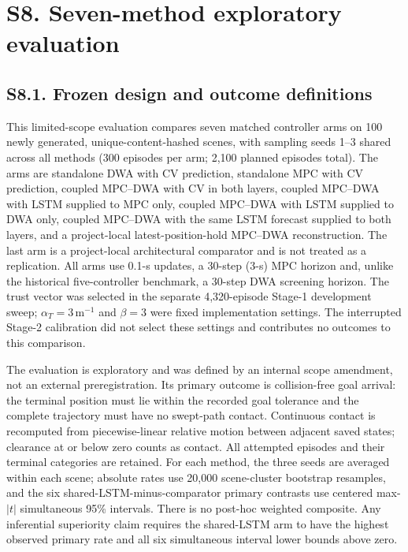 \documentclass[10pt]{article}
\begin{document}
\section*{S8. Seven-method exploratory evaluation}
\subsection*{S8.1. Frozen design and outcome definitions}
This limited-scope evaluation compares seven matched controller arms on 100 newly generated, unique-content-hashed scenes, with sampling seeds 1--3 shared across all methods (300 episodes per arm; 2,100 planned episodes total). The arms are standalone DWA with CV prediction, standalone MPC with CV prediction, coupled MPC--DWA with CV in both layers, coupled MPC--DWA with LSTM supplied to MPC only, coupled MPC--DWA with LSTM supplied to DWA only, coupled MPC--DWA with the same LSTM forecast supplied to both layers, and a project-local latest-position-hold MPC--DWA reconstruction. The last arm is a project-local architectural comparator and is not treated as a replication. All arms use 0.1-s updates, a 30-step (3-s) MPC horizon and, unlike the historical five-controller benchmark, a 30-step DWA screening horizon. The trust vector was selected in the separate 4,320-episode Stage-1 development sweep; $\alpha_T=3\,\mathrm m^{-1}$ and $\beta=3$ were fixed implementation settings. The interrupted Stage-2 calibration did not select these settings and contributes no outcomes to this comparison.

The evaluation is exploratory and was defined by an internal scope amendment, not an external preregistration. Its primary outcome is collision-free goal arrival: the terminal position must lie within the recorded goal tolerance and the complete trajectory must have no swept-path contact. Continuous contact is recomputed from piecewise-linear relative motion between adjacent saved states; clearance at or below zero counts as contact. All attempted episodes and their terminal categories are retained. For each method, the three seeds are averaged within each scene; absolute rates use 20,000 scene-cluster bootstrap resamples, and the six shared-LSTM-minus-comparator primary contrasts use centered max-$|t|$ simultaneous 95\% intervals. There is no post-hoc weighted composite. Any inferential superiority claim requires the shared-LSTM arm to have the highest observed primary rate and all six simultaneous interval lower bounds above zero.
\end{document}
